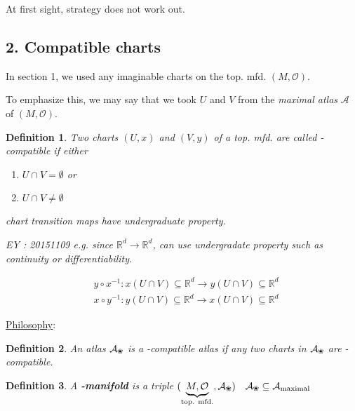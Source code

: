 \documentclass[10pt, twoside]{amsart}
\newtheorem{definition}{Definition}
\begin{document}
\begin{multicols*}{2}
At first sight, strategy does not work out.  

\subsection{2. Compatible charts}

In section 1, we used any imaginable charts on the top. mfd. $(M,\mathcal{O})$.  

To emphasize this, we may say that we took $U$ and $V$ from the \emph{maximal atlas} $\mathcal{A}$ of $(M,\mathcal{O})$.  


\begin{definition}
Two charts $(U,x)$ and $(V,y)$ of a top. mfd. are called -compatible if 
either
\begin{enumerate}
  \item[(a)] $U \cap V = \emptyset$
or  \item[(b)] $U\cap V \neq \emptyset$
\end{enumerate}
chart transition maps have undergraduate  property.

EY : 20151109 e.g. since $\mathbb{R}^d \to \mathbb{R}^d$, can use undergradate  property such as continuity or differentiability.

\[
\begin{aligned}
  & y \circ x^{-1} : x(U \cap V) \subseteq \mathbb{R}^d  \to y(U\cap V) \subseteq \mathbb{R}^d  \\
  & x\circ y^{-1} : y(U\cap V) \subseteq \mathbb{R}^d   \to x(U\cap V) \subseteq \mathbb{R}^d
\end{aligned}
\]
\end{definition}

\underline{Philosophy}: 

\begin{definition}
  An atlas $\mathcal{A}_{\text{\ding{96}}}$ is a -compatible atlas if any two charts in $\mathcal{A}_{\text{\ding{96}}}$ are -compatible.

\end{definition}

\begin{definition}
  A \textbf{-manifold} is a triple $(\underbrace{ M,\mathcal{O} }_{\text{top. mfd.} }, \mathcal{A}_{\text{\ding{96}}})$ \quad \, $\mathcal{A}_{\text{\ding{96}}} \subseteq \mathcal{A}_{\text{maximal}} $
\end{definition}



\end{multicols*}
\end{document}
